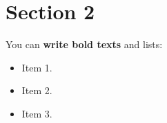 \section{Section 2}
You can \textbf{write bold texts} and lists:
\begin{itemize}
    \item Item 1.
    \item Item 2.
    \item Item 3.
\end{itemize}
